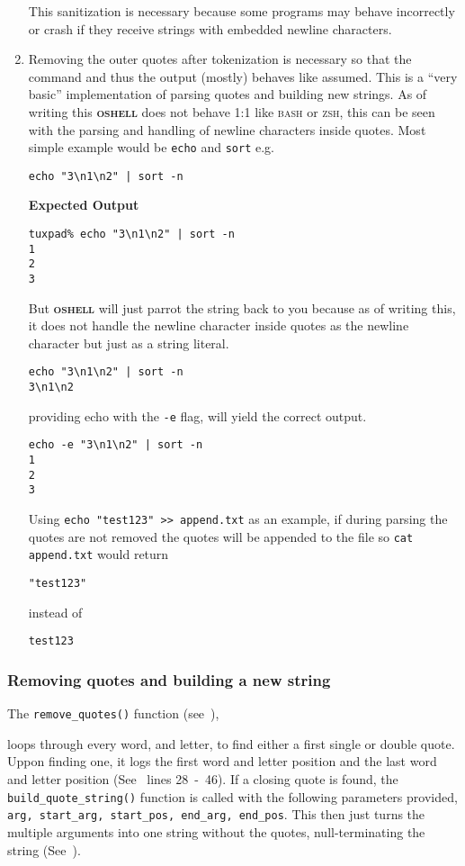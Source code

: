 \documentclass[12pt,english]{article}
\newcommand{\funcname}[1]{\texttt{#1()}\xspace} %
\newcommand{\projectname}{\textsc{oshell}}
\newcommand{\mycomment}[1]{}
\begin{document}
\begin{enumerate}
This sanitization is necessary because some programs may behave
incorrectly or crash
if they receive strings with embedded newline characters.


\item Removing the outer quotes after
  tokenization is necessary so that the command and thus
  the output (mostly)
  behaves like assumed.
  This is a ``very basic'' implementation of parsing quotes and
  building new strings. As of writing this \textbf{\projectname}
  does not behave 1:1 like \textsc{bash} or \textsc{zsh}, this
  can be seen with the parsing and handling of newline characters
  inside quotes. Most simple example would be \texttt{echo} and
  \texttt{sort} e.g.
\begin{verbatim}
echo "3\n1\n2" | sort -n
\end{verbatim}
  \textbf{Expected Output}
\begin{verbatim}
tuxpad% echo "3\n1\n2" | sort -n
1
2
3
\end{verbatim}
  But \textbf{\projectname} will just parrot the string back to you because as
  of writing this, it does not handle the newline character inside
  quotes as the newline character but just as a string literal.
\begin{verbatim}
echo "3\n1\n2" | sort -n
3\n1\n2
\end{verbatim}
  providing echo with the \texttt{-e} flag, will yield the correct
  output.
\begin{verbatim}
echo -e "3\n1\n2" | sort -n
1
2
3
\end{verbatim}
  Using
  \texttt{echo "test123" >> append.txt} as an example,
  if during parsing the quotes are not removed the quotes will
  be appended to the file so
  \texttt{cat append.txt} would return
\begin{verbatim}
"test123"
\end{verbatim}
  instead of
\begin{verbatim}
test123
\end{verbatim}
\end{enumerate}
  \subsubsection{Removing quotes and building a new string}
  The \funcname{remove\_quotes}
  function (see~),
  \mycomment{
 \textbf{---------------}
  keeps track of the
  processed arguments to be able to piece together the
  ``unmodified'' strings later.
\textbf{---------------}
  }
  loops through every word, and letter, to find either a first
  single or double quote. Uppon finding one, it logs the first word
  and letter position and the last word and
  letter position (See~
  lines 28~-~46).
  If a closing quote is found, the \funcname{build\_quote\_string}
  function is called with the following parameters
  provided,
  \texttt{arg, start\_arg, start\_pos, end\_arg, end\_pos}.
  This then just turns the multiple arguments into one string without
  the quotes, null-terminating the string (See~).
\end{document}
